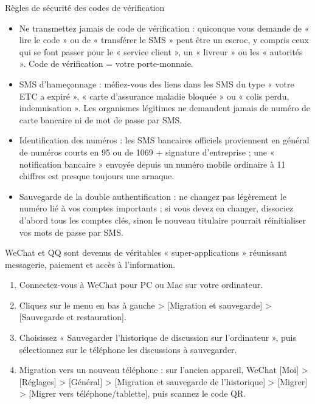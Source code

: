 \begin{tcbwarn}{Règles de sécurité des codes de vérification}
\begin{itemize}
  \item Ne transmettez jamais de code de vérification : quiconque vous demande de « lire le code » ou de « transférer le SMS » peut être un escroc, y compris ceux qui se font passer pour le « service client », un « livreur » ou les « autorités ». Code de vérification = votre porte-monnaie.
  \item SMS d'hameçonnage : méfiez-vous des liens dans les SMS du type « votre ETC a expiré », « carte d'assurance maladie bloquée » ou « colis perdu, indemnisation ». Les organismes légitimes ne demandent jamais de numéro de carte bancaire ni de mot de passe par SMS.
  \item Identification des numéros : les SMS bancaires officiels proviennent en général de numéros courts en 95 ou de 1069 + signature d'entreprise ; une « notification bancaire » envoyée depuis un numéro mobile ordinaire à 11 chiffres est presque toujours une arnaque.
  \item Sauvegarde de la double authentification : ne changez pas légèrement le numéro lié à vos comptes importants ; si vous devez en changer, dissociez d'abord tous les comptes clés, sinon le nouveau titulaire pourrait réinitialiser vos mots de passe par SMS.
\end{itemize}

\end{tcbwarn}


WeChat et QQ sont devenus de véritables « super-applications » réunissant messagerie, paiement et accès à l'information.


\begin{enumerate}
  \item Connectez-vous à WeChat pour PC ou Mac sur votre ordinateur.
  \item Cliquez sur le menu en bas à gauche > [Migration et sauvegarde] > [Sauvegarde et restauration].
  \item Choisissez « Sauvegarder l'historique de discussion sur l'ordinateur », puis sélectionnez sur le téléphone les discussions à sauvegarder.
  \item Migration vers un nouveau téléphone : sur l'ancien appareil, WeChat [Moi] > [Réglages] > [Général] > [Migration et sauvegarde de l'historique] > [Migrer] > [Migrer vers téléphone/tablette], puis scannez le code QR.
\end{enumerate}

